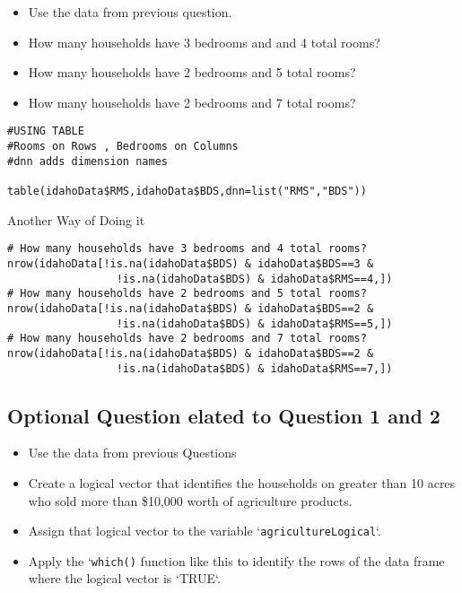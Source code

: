 \documentclass[]{article}
\begin{document}
\begin{framed}
\begin{itemize}
\item Use the data from previous question. 
\item How many households have 3 bedrooms and and 4 total rooms? 
\item How many households have 2 bedrooms and 5 total rooms? 
\item How many households have 2 bedrooms and 7 total rooms?
\end{itemize}
\begin{framed}
\begin{verbatim}
#USING TABLE
#Rooms on Rows , Bedrooms on Columns
#dnn adds dimension names

table(idahoData$RMS,idahoData$BDS,dnn=list("RMS","BDS"))

\end{verbatim}
\end{framed}
Another Way of Doing it
\begin{framed}
\begin{verbatim}
# How many households have 3 bedrooms and 4 total rooms?
nrow(idahoData[!is.na(idahoData$BDS) & idahoData$BDS==3 &
                 !is.na(idahoData$BDS) & idahoData$RMS==4,])
# How many households have 2 bedrooms and 5 total rooms?
nrow(idahoData[!is.na(idahoData$BDS) & idahoData$BDS==2 &
                 !is.na(idahoData$BDS) & idahoData$RMS==5,])
# How many households have 2 bedrooms and 7 total rooms?
nrow(idahoData[!is.na(idahoData$BDS) & idahoData$BDS==2 &
                 !is.na(idahoData$BDS) & idahoData$RMS==7,])

\end{verbatim}
\end{framed}


\newpage
\subsection*{Optional Question elated to Question 1 and 2}
\begin{itemize}
\item Use the data from previous Questions 
\item Create a logical vector that identifies the households on greater than 10 acres who sold more than \$10,000 worth of agriculture products. 
\item Assign that logical vector to the variable `\texttt{agricultureLogical}`. 
\item Apply the `\texttt{which()} function like this to identify the rows of the data frame where the logical vector is `TRUE`.
\end{itemize}


\end{framed}
\end{document}
